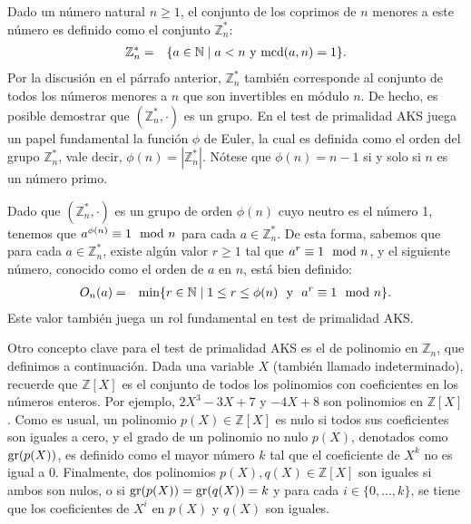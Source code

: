 Dado un número natural $n \geq 1$, el conjunto de los coprimos de $n$
menores a este número es definido como el conjunto
$\mathbb{Z}_n^*$:
\begin{eqnarray} \label{eq-zn-star}
  \mathbb{Z}_n^* & = & \{ a \in \mathbb{N} \mid a < n \text{ y }
  {\rm mcd}(a,n) = 1\}.
\end{eqnarray}
Por la discusión en el párrafo anterior, $\mathbb{Z}_n^*$ también
corresponde al conjunto de todos los números menores a $n$ que
son invertibles en módulo $n$. De hecho, es posible demostrar que
$(\mathbb{Z}_n^*, \cdot)$ es un grupo. En el test de primalidad AKS
juega un papel fundamental la función $\phi$ de Euler, la cual es
definida como el orden del grupo $\mathbb{Z}_n^*$, vale decir,
$\phi(n) = |\mathbb{Z}_n^*|$. Nótese que $\phi(n) = n -1$ si y solo si
$n$ es un número primo.

Dado que $(\mathbb{Z}_n^*, \cdot)$ es un grupo de orden $\phi(n)$ cuyo
neutro es el número 1, tenemos que $a^{\phi(n)} \equiv 1 \mod n$ para
cada $a \in \mathbb{Z}_n^*$. De esta forma, sabemos que para cada $a
\in \mathbb{Z}_n^*$, existe algún valor $r \geq 1$ tal que $a^r \equiv
1 \mod n$, y el siguiente número, conocido como el orden de $a$ en
$n$, está bien definido:
\begin{eqnarray*}
  O_n(a) & = & \min \{ r \in \mathbb{N} \mid 1 \leq r \leq \phi(n)
  \ \text{ y } \ a^r \equiv 1 \mod n \}.
\end{eqnarray*}
Este valor también juega un rol fundamental en test de primalidad AKS.

Otro concepto clave para el test de primalidad AKS es el de
polinomio en $\mathbb{Z}_n$, que definimos a continuación. Dada una
variable $X$ (también llamado indeterminado), recuerde que
$\mathbb{Z}[X]$ es el conjunto de todos los polinomios con
coeficientes en los números enteros. Por ejemplo, $2 X^3 - 3X +7$ y
$-4 X + 8$ son polinomios en $\mathbb{Z}[X]$. Como es usual, un
polinomio $p(X) \in \mathbb{Z}[X]$ es nulo si todos sus coeficientes
son iguales a cero, y el grado de un polinomio no nulo $p(X)$,
denotados como ${\rm gr}(p(X))$, es definido como el mayor número $k$
tal que el coeficiente de $X^k$ no es igual a $0$. Finalmente, dos
polinomios $p(X), q(X) \in \mathbb{Z}[X]$ son iguales si ambos son
nulos, o si ${\rm gr}(p(X))={\rm gr}(q(X)) = k$ y para cada $i \in \{0,
\ldots, k\}$, se tiene que los coeficientes de $X^i$ en $p(X)$ y
$q(X)$ son iguales.

